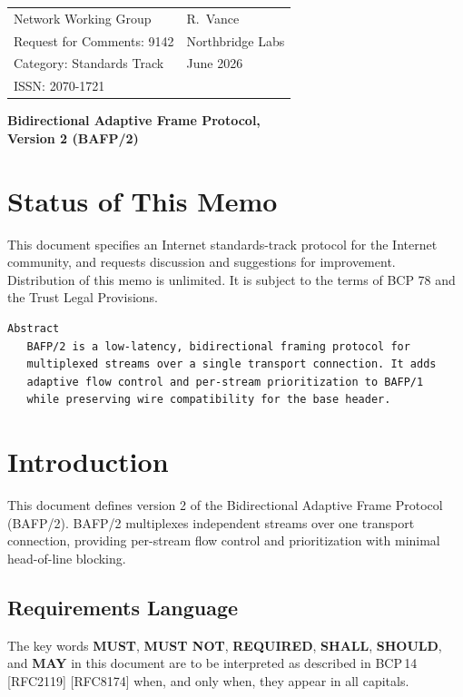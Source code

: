 \documentclass[11pt]{article}
\newcommand{\bcp}[1]{\textbf{\textcolor{accent}{#1}}}   %
\begin{document}
\begin{tabularx}{\linewidth}{@{}p{7.5cm} X@{}}
{\ttfamily\small Network Working Group} & \hfill{\ttfamily\small R.\ Vance}\\
{\ttfamily\small Request for Comments: 9142} & \hfill{\ttfamily\small Northbridge Labs}\\
{\ttfamily\small Category: Standards Track} & \hfill{\ttfamily\small June 2026}\\
{\ttfamily\small ISSN: 2070-1721} & \hfill{\ttfamily\small}\\
\end{tabularx}

\vspace{6pt}
\begin{center}
{\Large\bfseries\color{ink} Bidirectional Adaptive Frame Protocol,\\ Version 2 (BAFP/2)}
\end{center}

\section*{Status of This Memo}
\vspace{-4pt}
{\small This document specifies an Internet standards-track protocol for the Internet
community, and requests discussion and suggestions for improvement. Distribution of this
memo is unlimited. It is subject to the terms of BCP 78 and the Trust Legal Provisions.}

\begin{lstlisting}
Abstract
   BAFP/2 is a low-latency, bidirectional framing protocol for
   multiplexed streams over a single transport connection. It adds
   adaptive flow control and per-stream prioritization to BAFP/1
   while preserving wire compatibility for the base header.
\end{lstlisting}

\section{Introduction}
This document defines version 2 of the Bidirectional Adaptive Frame Protocol (BAFP/2).
BAFP/2 multiplexes independent streams over one transport connection, providing per-stream
flow control and prioritization with minimal head-of-line blocking.

\subsection{Requirements Language}
The key words \bcp{MUST}, \bcp{MUST NOT}, \bcp{REQUIRED}, \bcp{SHALL}, \bcp{SHOULD}, and
\bcp{MAY} in this document are to be interpreted as described in BCP\,14 [RFC2119] [RFC8174]
when, and only when, they appear in all capitals.
\end{document}
